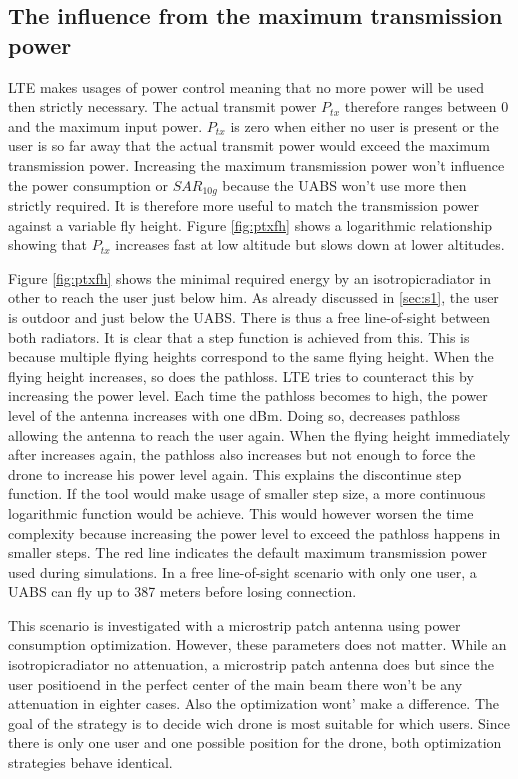 \subsection{The influence from the maximum transmission power}
\gls{LTE} makes usages of power control meaning that no more power will be used then strictly necessary. The actual 
transmit power $P_{tx}$ therefore ranges between 0 and the maximum input power. $P_{tx}$ is zero when either no user is 
present or the user is so far away that the actual transmit power would exceed the maximum transmission power.
Increasing the maximum transmission power won't influence the power consumption or $SAR_{10g}$ because the \gls{UABS} won't use more
then strictly required. It is therefore more useful to match the transmission power against a variable fly height. Figure \ref{fig:ptxfh}
shows a logarithmic  relationship showing that $P_{tx}$ increases fast at low altitude but slows down at lower altitudes. 

Figure \ref{fig:ptxfh} shows the minimal required energy by an \gls{isotropicradiator} in other to reach the user just below him.
As already discussed in \ref{sec:s1}, the user is outdoor and just below the \gls{UABS}. There is thus a free line-of-sight between both
radiators. It is clear that a step function is achieved from this. This is because multiple flying heights correspond to the same flying height.
When the flying height increases, so does the pathloss. \gls{LTE} tries to counteract this by increasing the power level. Each time 
the pathloss becomes to high, the power level of the antenna increases with one dBm. Doing so, decreases pathloss allowing the antenna to reach
the user again. When the flying height immediately after increases again, the pathloss also increases but not enough to force the drone to 
increase his power level again. This explains the discontinue step function. If the tool would make usage of smaller step size, a more continuous 
logarithmic function would be achieve. This would however worsen the time complexity because increasing the power level to exceed the pathloss
 happens in smaller steps. The red line indicates the default maximum transmission power used during simulations. 
In a free line-of-sight scenario with only one user, a \gls{UABS} can fly up to 387 meters before losing connection.

This scenario is investigated with a microstrip patch antenna using power consumption optimization. However, these parameters does not matter.
While an \gls{isotropicradiator} no attenuation, a microstrip patch antenna does but since the user positioend in the perfect center of the main beam there
won't be any attenuation in eighter cases. Also the optimization wont' make a difference. The goal of the  strategy is to decide wich drone is most suitable for which
users. Since there is only one user and one possible position for the drone, both optimization strategies behave identical.

